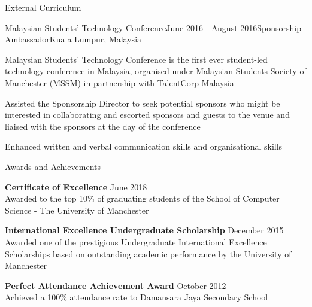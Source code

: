 \documentclass{resume} %
\begin{document}
\begin{rSection}{External Curriculum}

\begin{rSubsection}{Malaysian Students' Technology Conference}{June 2016 - August 2016}{Sponsorship Ambassador}{Kuala Lumpur, Malaysia}
\item Malaysian Students' Technology Conference is the first ever student-led technology conference in Malaysia, organised under Malaysian Students Society of Manchester (MSSM) in partnership with TalentCorp Malaysia
\item Assisted the Sponsorship Director to seek potential sponsors who might be interested in collaborating and escorted sponsors and guests to the venue and liaised with the sponsors at the day of the conference
\item Enhanced written and verbal communication skills and organisational skills
\end{rSubsection}

\end{rSection}


\begin{rSection}{Awards and Achievements}

\item[] {\bf Certificate of Excellence} \hfill {June 2018} \\
Awarded to the top 10\% of graduating students of the School of Computer Science - The University of Manchester

\item[] {\bf International Excellence Undergraduate Scholarship} \hfill {December 2015} \\
Awarded one of the prestigious Undergraduate International Excellence Scholarships based on outstanding academic performance by the University of Manchester

\item[] {\bf Perfect Attendance Achievement Award} \hfill {October 2012} \\
Achieved a 100\% attendance rate to Damansara Jaya Secondary School

\end{rSection}

\end{document}
